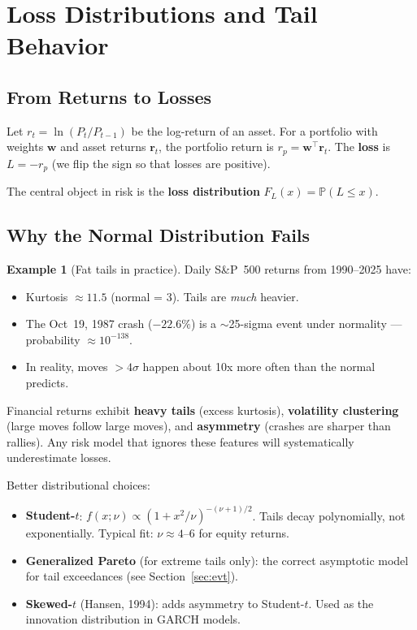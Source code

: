 \documentclass[11pt, a4paper]{article}
\theoremstyle{definition}
\newtheorem{example}{Example}[section]
\theoremstyle{plain}
\theoremstyle{remark}
\newcommand{\PV}{\mathbb{P}}
\begin{document}
\section{Loss Distributions and Tail Behavior}

\subsection{From Returns to Losses}

Let $r_t = \ln(P_t / P_{t-1})$ be the log-return of an asset.
For a portfolio with weights $\bm{w}$ and asset returns $\bm{r}_t$, the portfolio return is $r_p = \bm{w}^\top \bm{r}_t$.
The \textbf{loss} is $L = -r_p$ (we flip the sign so that losses are positive).

The central object in risk is the \textbf{loss distribution} $F_L(x) = \PV(L \leq x)$.

\subsection{Why the Normal Distribution Fails}

\begin{example}[Fat tails in practice]\label{ex:fat-tails}
Daily S\&P~500 returns from 1990--2025 have:
\begin{itemize}
    \item Kurtosis $\approx 11.5$ (normal = 3). Tails are \emph{much} heavier.
    \item The Oct~19, 1987 crash ($-22.6\%$) is a $\sim$25-sigma event under normality --- probability $\approx 10^{-138}$.
    \item In reality, moves $> 4\sigma$ happen about 10x more often than the normal predicts.
\end{itemize}
\end{example}

\begin{keyresult}
Financial returns exhibit \textbf{heavy tails} (excess kurtosis), \textbf{volatility clustering} (large moves follow large moves), and \textbf{asymmetry} (crashes are sharper than rallies).
Any risk model that ignores these features will systematically underestimate losses.
\end{keyresult}

Better distributional choices:
\begin{itemize}
    \item \textbf{Student-$t$}: $f(x; \nu) \propto (1 + x^2/\nu)^{-(\nu+1)/2}$. Tails decay polynomially, not exponentially. Typical fit: $\nu \approx 4$--$6$ for equity returns.
    \item \textbf{Generalized Pareto} (for extreme tails only): the correct asymptotic model for tail exceedances (see Section~\ref{sec:evt}).
    \item \textbf{Skewed-$t$} (Hansen, 1994): adds asymmetry to Student-$t$. Used as the innovation distribution in GARCH models.
\end{itemize}
\end{document}
